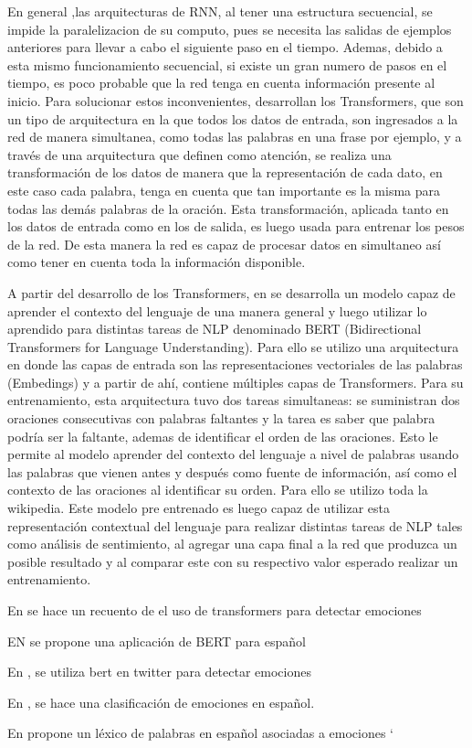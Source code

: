 En general ,las arquitecturas de RNN, al tener una estructura secuencial, se impide la paralelizacion de su computo, pues se necesita las salidas de ejemplos anteriores para llevar a cabo el siguiente paso en el tiempo. Ademas, debido a esta mismo funcionamiento secuencial, si existe un gran numero de pasos en el tiempo, es poco probable que la red tenga en cuenta información presente al inicio. Para solucionar estos inconvenientes, \cite{vaswani2017attention} desarrollan los Transformers, que son un tipo de arquitectura en la que todos los datos de entrada, son ingresados a la red de manera simultanea, como todas las palabras en una frase por ejemplo, y a través de una arquitectura que definen como atención, se realiza una transformación de los datos de manera que la representación de cada dato, en este caso cada palabra, tenga en cuenta que tan importante es la misma para todas las demás palabras de la oración. Esta transformación, aplicada tanto en los datos de entrada como en los de salida, es luego usada para entrenar los pesos de la red. De esta manera la red es capaz de procesar datos en simultaneo así como tener en cuenta toda la información disponible.
 

A partir del desarrollo de los Transformers, en  \cite{devlin2018bert} se desarrolla un modelo capaz de aprender el contexto del lenguaje de una manera general y luego utilizar lo aprendido para distintas tareas de NLP denominado BERT (Bidirectional Transformers for Language Understanding). Para ello se utilizo una arquitectura en donde las capas de entrada son las representaciones vectoriales de las palabras (Embedings) y a partir de ahí, contiene múltiples capas de Transformers. Para su entrenamiento, esta arquitectura tuvo dos tareas simultaneas: se suministran dos oraciones consecutivas con palabras faltantes y la tarea es saber que palabra podría ser la faltante, ademas de identificar el orden de las oraciones. Esto le permite al modelo aprender del contexto del lenguaje a nivel de palabras usando las palabras que vienen antes y después como fuente de información, así como el contexto de las oraciones al identificar su orden. Para ello se utilizo toda la wikipedia. Este modelo pre entrenado es luego capaz de utilizar esta representación contextual del lenguaje para realizar distintas tareas de NLP tales como análisis de sentimiento, al agregar una capa final a la red que produzca un posible resultado y al comparar este con su respectivo valor esperado realizar un entrenamiento.

En \cite{acheampong2021transformer} se hace un recuento de el uso de transformers para detectar emociones

EN \cite{canete2020spanish} se propone una aplicación de BERT para español

En \cite{gonzalez2021twilbert}, \cite{huang2019ana} se utiliza bert en twitter para  detectar emociones

En \cite{plaza2020improved}, \cite{gil2013combining} se hace una clasificación de emociones en español.


En \cite{sidorov2012empirical} propone un léxico de palabras en español asociadas a emociones
`








